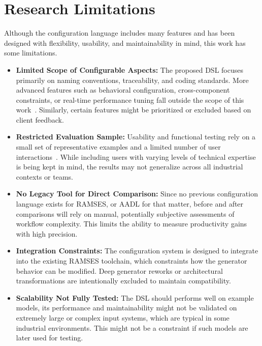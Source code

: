\section{Research Limitations}
\label{sec:research_limitations}

Although the configuration language includes many features and has been designed with flexibility, usability, and maintainability in mind, this work has some limitations.

\begin{itemize}
	\item \textbf{Limited Scope of Configurable Aspects:} The proposed DSL focuses primarily on naming conventions, traceability, and coding standards. More advanced features such as behavioral configuration, cross-component constraints, or real-time performance tuning fall outside the scope of this work~\cite{software_product_lines_practices_and_patterns_2015}. Similarly, certain features might be prioritized or excluded based on client feedback.
	
	\item \textbf{Restricted Evaluation Sample:} Usability and functional testing rely on a small set of representative examples and a limited number of user interactions~\cite{Bias_Mayhew_1994}. While including users with varying levels of technical expertise is being kept in mind, the results may not generalize across all industrial contexts or teams.
	
	\item \textbf{No Legacy Tool for Direct Comparison:} Since no previous configuration language exists for \gls{RAMSES}, or AADL for that matter, before and after comparisons will rely on manual, potentially subjective assessments of workflow complexity. This limits the ability to measure productivity gains with high precision.
	
	\item \textbf{Integration Constraints:} The configuration system is designed to integrate into the existing \gls{RAMSES} toolchain, which constraints how the generator behavior can be modified. Deep generator reworks or architectural transformations are intentionally excluded to maintain compatibility.
	
	\item \textbf{Scalability Not Fully Tested:} The \gls{DSL} should performs well on example models, its performance and maintainability might not be validated on extremely large or complex input systems, which are typical in some industrial environments. This might not be a constraint if such models are later used for testing.
	
\end{itemize}

